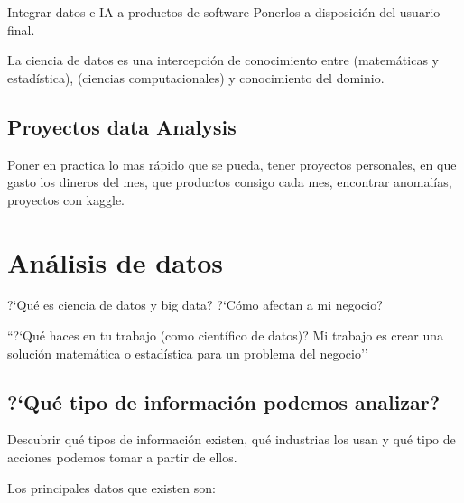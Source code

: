 Integrar datos e IA a productos de software
Ponerlos a disposici\'on del usuario final.


La ciencia de datos es una intercepci\'on de conocimiento entre (matem\'aticas y estad\'istica), (ciencias computacionales)  y conocimiento del dominio.

\section{Proyectos data Analysis}
Poner en practica lo mas r\'apido que se pueda, tener proyectos personales, en que gasto los dineros del mes, que productos consigo cada mes, encontrar anomal\'ias, proyectos con kaggle.

\chapter{An\'alisis de datos}

?`Qu\'e es ciencia de datos y big data? ?`C\'omo afectan a mi negocio?

``?`Qu\'e haces en tu trabajo (como cient\'ifico de datos)?
Mi trabajo es crear una soluci\'on matem\'atica o estad\'istica para un problema del negocio''

\section{?`Qu\'e tipo de informaci\'on podemos analizar?}


Descubrir qu\'e tipos de informaci\'on existen, qu\'e industrias los usan y qu\'e tipo de acciones podemos tomar a partir de ellos.

Los principales datos que existen son:

